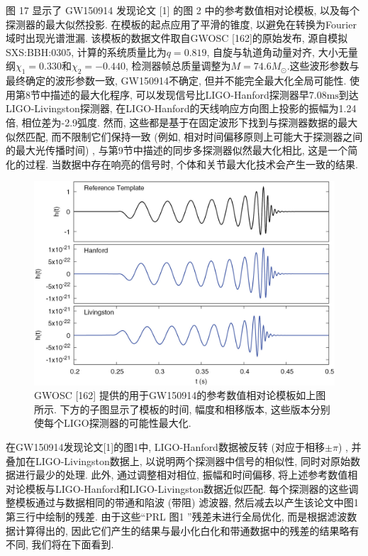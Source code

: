 \documentclass[a4paper]{\documentclassname}
\def\t{\text}
\theoremstyle{definition}
\begin{document}
图 17 显示了 GW150914 发现论文 [1] 的图 2 中的参考数值相对论模板, 以及每个探测器的最大似然投影. 在模板的起点应用了平滑的锥度, 以避免在转换为Fourier域时出现光谱泄漏. 该模板的数据文件取自GWOSC [162]的原始发布, 源自模拟SXS:BBH:0305, 计算的系统质量比为$q = 0.819$, 自旋与轨道角动量对齐, 大小无量纲$\chi_1=0.330$和$\chi_2=-0.440$, 检测器帧总质量调整为$M=74.6 M_\odot$.这些波形参数与最终确定的波形参数一致, GW150914不确定, 但并不能完全最大化全局可能性. 使用第8节中描述的最大化程序, 可以发现信号比LIGO-Hanford探测器早$7.08\t{ms}$到达LIGO-Livingston探测器, 在LIGO-Hanford的天线响应方向图上投影的振幅为1.24倍, 相位差为-2.9弧度. 然而, 这些都是基于在固定波形下找到与探测器数据的最大似然匹配, 而不限制它们保持一致 (例如, 相对时间偏移原则上可能大于探测器之间的最大光传播时间) , 与第9节中描述的同步多探测器似然最大化相比, 这是一个简化的过程. 当数据中存在响亮的信号时, 个体和关节最大化技术会产生一致的结果. 
\begin{figure}[htbp]
    \centering
    \includegraphics{img/17.jpg}
    \caption{
        GWOSC [162] 提供的用于GW150914的参考数值相对论模板如上图所示. 下方的子图显示了模板的时间, 幅度和相移版本, 这些版本分别使每个LIGO探测器的可能性最大化. 
    }
\end{figure}

在GW150914发现论文[1]的图1中, LIGO-Hanford数据被反转 (对应于相移$\pm \pi$) , 并叠加在LIGO-Livingston数据上, 以说明两个探测器中信号的相似性, 同时对原始数据进行最少的处理. 此外, 通过调整相对相位, 振幅和时间偏移, 将上述参考数值相对论模板与LIGO-Hanford和LIGO-Livingston数据近似匹配. 每个探测器的这些调整模板通过与数据相同的带通和陷波 (带阻) 滤波器, 然后减去以产生该论文中图1第三行中绘制的残差. 由于这些``PRL 图1 ''残差未进行全局优化, 而是根据滤波数据计算得出的, 因此它们产生的结果与最小化白化和带通数据中的残差的结果略有不同, 我们将在下面看到. 
\end{document}
